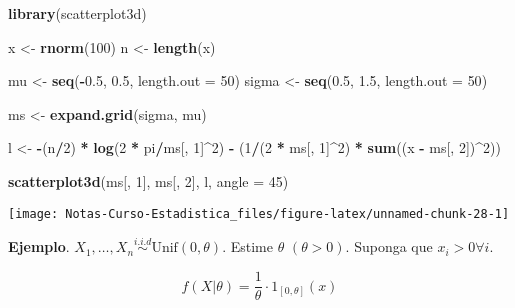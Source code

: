 \documentclass[
  12pt,
]{book}
\newenvironment{Shaded}{\begin{snugshade}}{\end{snugshade}}
\newcommand{\DataTypeTok}[1]{\textcolor[rgb]{0.13,0.29,0.53}{#1}}
\newcommand{\DecValTok}[1]{\textcolor[rgb]{0.00,0.00,0.81}{#1}}
\newcommand{\FloatTok}[1]{\textcolor[rgb]{0.00,0.00,0.81}{#1}}
\newcommand{\KeywordTok}[1]{\textcolor[rgb]{0.13,0.29,0.53}{\textbf{#1}}}
\newcommand{\NormalTok}[1]{#1}
\newcommand{\OperatorTok}[1]{\textcolor[rgb]{0.81,0.36,0.00}{\textbf{#1}}}
\newcommand{\StringTok}[1]{\textcolor[rgb]{0.31,0.60,0.02}{#1}}
\begin{document}
\begin{Shaded}
\begin{Highlighting}[]
\KeywordTok{library}\NormalTok{(scatterplot3d)}

\NormalTok{x \textless{}{-}}\StringTok{ }\KeywordTok{rnorm}\NormalTok{(}\DecValTok{100}\NormalTok{)}
\NormalTok{n \textless{}{-}}\StringTok{ }\KeywordTok{length}\NormalTok{(x)}

\NormalTok{mu \textless{}{-}}\StringTok{ }\KeywordTok{seq}\NormalTok{(}\OperatorTok{{-}}\FloatTok{0.5}\NormalTok{, }\FloatTok{0.5}\NormalTok{, }\DataTypeTok{length.out =} \DecValTok{50}\NormalTok{)}
\NormalTok{sigma \textless{}{-}}\StringTok{ }\KeywordTok{seq}\NormalTok{(}\FloatTok{0.5}\NormalTok{, }\FloatTok{1.5}\NormalTok{, }\DataTypeTok{length.out =} \DecValTok{50}\NormalTok{)}

\NormalTok{ms \textless{}{-}}\StringTok{ }\KeywordTok{expand.grid}\NormalTok{(sigma, mu)}

\NormalTok{l \textless{}{-}}\StringTok{ }\OperatorTok{{-}}\NormalTok{(n}\OperatorTok{/}\DecValTok{2}\NormalTok{) }\OperatorTok{*}\StringTok{ }\KeywordTok{log}\NormalTok{(}\DecValTok{2} \OperatorTok{*}\StringTok{ }\NormalTok{pi}\OperatorTok{/}\NormalTok{ms[, }\DecValTok{1}\NormalTok{]}\OperatorTok{\^{}}\DecValTok{2}\NormalTok{) }\OperatorTok{{-}}\StringTok{ }\NormalTok{(}\DecValTok{1}\OperatorTok{/}\NormalTok{(}\DecValTok{2} \OperatorTok{*}\StringTok{ }\NormalTok{ms[, }
    \DecValTok{1}\NormalTok{]}\OperatorTok{\^{}}\DecValTok{2}\NormalTok{) }\OperatorTok{*}\StringTok{ }\KeywordTok{sum}\NormalTok{((x }\OperatorTok{{-}}\StringTok{ }\NormalTok{ms[, }\DecValTok{2}\NormalTok{])}\OperatorTok{\^{}}\DecValTok{2}\NormalTok{))}

\KeywordTok{scatterplot3d}\NormalTok{(ms[, }\DecValTok{1}\NormalTok{], ms[, }\DecValTok{2}\NormalTok{], l, }\DataTypeTok{angle =} \DecValTok{45}\NormalTok{)}
\end{Highlighting}
\end{Shaded}

\begin{center}\texttt{[image: Notas-Curso-Estadistica\_files/figure-latex/unnamed-chunk-28-1]} \end{center}

\textbf{Ejemplo}. \(X_1,\dots, X_n \stackrel{i.i.d}{\sim} \text{Unif}(0, \theta)\). Estime \(\theta\) \((\theta > 0)\). Suponga que \(x_i>0 \forall i\).

\[f(X|\theta) = \dfrac 1\theta \cdot 1_{[0,\theta]}(x)\]
\end{document}
